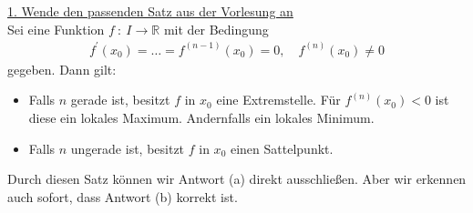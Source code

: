 \underline{1. Wende den passenden Satz aus der Vorlesung an}\\
Sei eine Funktion $f \ : \ I \to \mathbb{R}$ mit der Bedingung
\begin{align*}
f^\prime(x_0)= \dots = f^{(n-1)}(x_0) =0, \quad f^{(n)}(x_0) \neq 0
\end{align*}
gegeben.
Dann gilt:
\begin{itemize}
\item Falls $n$ gerade ist, besitzt $f$ in $x_0$ eine Extremstelle.
Für $f^{(n)}(x_0) < 0$ ist diese ein lokales Maximum.
Andernfalls ein lokales Minimum.

\item Falls $n$ ungerade ist, besitzt $f$ in $x_0$ einen Sattelpunkt.
\end{itemize}
Durch diesen Satz können wir Antwort (a) direkt ausschließen.
Aber wir erkennen auch sofort, dass Antwort (b) korrekt ist.